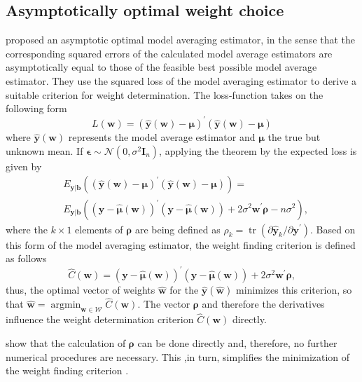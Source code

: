 
\subsection{Asymptotically optimal weight choice}
\label{chap:4.3.Asymptoticallyoptimalweightchoice}

\cite{Zhang.2014} proposed an asymptotic optimal model averaging estimator, in the sense that the corresponding squared errors of the calculated model average estimators are asymptotically equal to those of the feasible best possible model average estimator.
They use the squared loss of the model averaging estimator to derive a suitable criterion for weight determination. The loss-function takes on the following form
\begin{equation*}
\label{lossRisk}
L( \boldsymbol w)= (\hat{ \boldsymbol y}(\boldsymbol w) - \boldsymbol \mu)^\prime(\hat{ \boldsymbol y}(\boldsymbol w) - \boldsymbol \mu)
\end{equation*}
where $\hat{ \boldsymbol y}(\boldsymbol w)$ represents the model average estimator and $\boldsymbol \mu$ the true but unknown mean. If $ \boldsymbol \epsilon \sim \mathcal{N}\left( 0, \sigma^{2}  \boldsymbol I_{n}\right)$, applying the theorem by \cite{stein1972bound} the expected loss is given by
\label{angepassterisk}
\begin{align*}
   &E_{ \boldsymbol y| \boldsymbol b} \left( (\hat{ \boldsymbol y}(\boldsymbol w) - \boldsymbol \mu)^\prime(\hat{ \boldsymbol y}(\boldsymbol w) - \boldsymbol \mu) \right) = \\
   &E_{ \boldsymbol y |  \boldsymbol b}\left(  ( { \boldsymbol y}- \hat{\boldsymbol \mu}(\boldsymbol w))^{\prime}( { \boldsymbol y}- \hat{\boldsymbol \mu}(\boldsymbol w))  +2 \sigma^{2}  \boldsymbol w^{\prime}  \boldsymbol \rho-n \sigma^{2}\right),
\end{align*}
where the $k \times 1$ elements of $\boldsymbol \rho$ are being defined as $\rho_{k} = \operatorname{tr}\left({\partial \hat{ \boldsymbol y}_{k}} / {\partial  \boldsymbol y^{\prime}}\right)$. Based on this form of the model averaging estimator, the weight finding criterion is defined as follows
\begin{equation*}
\label{gewichtskriterium}
\hat{C}( \boldsymbol w)=  \left( { \boldsymbol y}- \hat{\boldsymbol \mu}(\boldsymbol w)\right)^{\prime} \left( { \boldsymbol y}- \hat{\boldsymbol \mu}(\boldsymbol w) \right) +2 \sigma^{2}  \boldsymbol w^{\prime}  \boldsymbol \rho,
\end{equation*}
thus, the optimal vector of weights $\hat{ \boldsymbol w}$ for the $\hat{ \boldsymbol y}(\hat{ \boldsymbol w})$ minimizes this criterion, so that $\hat{ \boldsymbol w}=\operatorname{argmin}_{ \boldsymbol w \in \mathcal{W}} \hat{C}( \boldsymbol w)$.
The vector $ \boldsymbol \rho$ and therefore the derivatives influence the weight determination criterion $\hat{C}( \boldsymbol w)$ directly. 

\cite{Greven.2010} show that the calculation of $\boldsymbol{\rho}$ can be done directly and, therefore, no further numerical procedures are necessary. This ,in turn, simplifies the minimization of the weight finding criterion \citep{Zhang.2014}.
